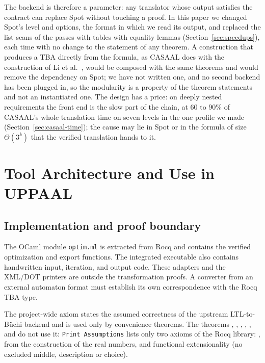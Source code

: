 \documentclass[preprint,12pt]{elsarticle}
\let\pathfragile\path
\DeclareRobustCommand\path{\pathfragile}
\begin{document}
The backend is therefore a parameter: any translator whose output satisfies the contract can replace Spot without touching a proof. In this paper we changed Spot's level and options, the format in which we read its output, and replaced the list scans of the passes with tables with equality lemmas (Section~\ref{sec:speedups}), each time with no change to the statement of any theorem. A construction that produces a TBA directly from the formula, as CASAAL does with the construction of Li et al.~\cite{li_spin7}, would be composed with the same theorems and would remove the dependency on Spot; we have not written one, and no second backend has been plugged in, so the modularity is a property of the theorem statements and not an instantiated one. The design has a price: on deeply nested requirements the front end is the slow part of the chain, at 60 to 90\% of CASAAL's whole translation time on seven levels in the one profile we made (Section~\ref{sec:casaal-time}); the cause may lie in Spot or in the formula of size $\Theta(3^k)$ that the verified translation hands to it.

\section{Tool Architecture and Use in UPPAAL}
\label{sec:toolchain}
\subsection{Implementation and proof boundary}
The OCaml module \texttt{optim.ml} is extracted from Rocq and contains the
verified optimization and export functions. The integrated executable also
contains handwritten input, iteration, and output code. These adapters and
the XML/DOT printers are outside the transformation proofs. A converter from
an external automaton format must establish its own correspondence with the
Rocq TBA type. 

The project-wide axiom  states the assumed correctness of the upstream LTL-to-B\"uchi backend and is used only by convenience theorems. The theorems , , , , ,  and  do not use it: \texttt{Print Assumptions} lists only two axioms of the Rocq library: , from the construction of the real numbers, and functional extensionality (no excluded middle, description or choice).
\end{document}
